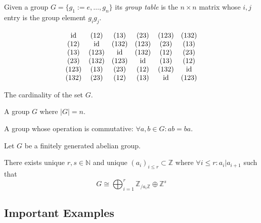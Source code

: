 \begin{definition}
   Given a group \(G = \{g_1 := e, \ldots, g_n\}\) its \emph{group table} is the \(n \times n\) matrix whose \(i,j\) entry is the group element \(g_ig_j\).
\end{definition}
\begin{example}
   \[\begin{matrix}
         \operatorname{id}  & (12)  & (13)  & (23)  & (123) & (132) \\
         (12) & \operatorname{id}   & (132) & (123) & (23)  & (13)  \\
         (13) & (123) & \operatorname{id}   & (132) & (12)  & (23)  \\
         (23) & (132) & (123) & \operatorname{id}   & (13)  & (12)  \\
         (123) & (13) & (23) & (12)   & (132) & \operatorname{id}   \\
         (132) & (23) & (12) & (13)   & \operatorname{id}   & (123) \\
   \end{matrix}\]
\end{example}

\begin{definition}
   The cardinality of the set \(G\).
\end{definition}

\begin{definition}
   A group \(G\) where \(|G| = n\).
\end{definition}

\begin{definition}\label{def:abel_group}
   A group whose operation is commutative: \(\forall a, b \in G: ab = ba\).
\end{definition}

\begin{theorem}
   Let \(G\) be a finitely generated abelian group.

   There exists unique \(r, s \in \mathbb{N}\) and unique \((a_i)_{i \leq r} \subset \mathbb{Z}\) where \(\forall i \leq r: a_i | a_{i+1}\) such that
   \[G \cong \bigoplus_{i = 1}^r \mathbb{Z}_{/a_i\mathbb{Z}} \oplus \mathbb{Z}^s\]
\end{theorem}

\subsection{Important Examples}
